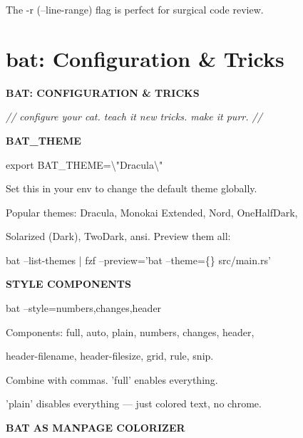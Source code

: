 \documentclass[11pt,a4paper,twoside]{book}
\begin{document}
The -r (--line-range) flag is perfect for surgical code review.


\vspace{16pt}

\section{bat: Configuration \& Tricks}


\vspace{10pt}
{\large\bfseries\color{neoncyan} BAT: CONFIGURATION \& TRICKS}\vspace{6pt}

{\small\itshape\color{dimtext} // configure your cat. teach it new tricks. make it purr. //}


\vspace{12pt}
{\bfseries\color{neonyellow} BAT\_THEME}\vspace{4pt}

export BAT\_THEME=\textbackslash{}"Dracula\textbackslash{}"

Set this in your env to change the default theme globally.

Popular themes: Dracula, Monokai Extended, Nord, OneHalfDark,

Solarized (Dark), TwoDark, ansi. Preview them all:

\begin{codebox}
bat --list-themes | fzf --preview='bat --theme=\{\} src/main.rs'\\
\end{codebox}


\vspace{12pt}
{\bfseries\color{neonyellow} STYLE COMPONENTS}\vspace{4pt}

\begin{codebox}
bat --style=numbers,changes,header\\
\end{codebox}

Components: full, auto, plain, numbers, changes, header,

header-filename, header-filesize, grid, rule, snip.

Combine with commas. 'full' enables everything.

'plain' disables everything — just colored text, no chrome.


\vspace{12pt}
{\bfseries\color{neonyellow} BAT AS MANPAGE COLORIZER}\vspace{4pt}
\end{document}
